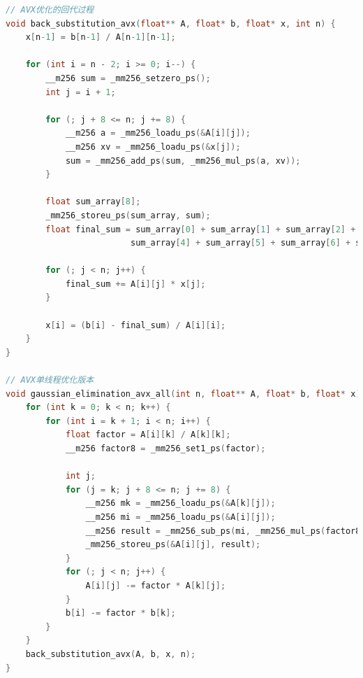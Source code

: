 \documentclass{nku}
\begin{document}
\begin{lstlisting}[language=C]
// AVX优化的回代过程
void back_substitution_avx(float** A, float* b, float* x, int n) {
    x[n-1] = b[n-1] / A[n-1][n-1];

    for (int i = n - 2; i >= 0; i--) {
        __m256 sum = _mm256_setzero_ps();
        int j = i + 1;

        for (; j + 8 <= n; j += 8) {
            __m256 a = _mm256_loadu_ps(&A[i][j]);
            __m256 xv = _mm256_loadu_ps(&x[j]);
            sum = _mm256_add_ps(sum, _mm256_mul_ps(a, xv));
        }

        float sum_array[8];
        _mm256_storeu_ps(sum_array, sum);
        float final_sum = sum_array[0] + sum_array[1] + sum_array[2] + sum_array[3] +
                         sum_array[4] + sum_array[5] + sum_array[6] + sum_array[7];

        for (; j < n; j++) {
            final_sum += A[i][j] * x[j];
        }

        x[i] = (b[i] - final_sum) / A[i][i];
    }
}

// AVX单线程优化版本
void gaussian_elimination_avx_all(int n, float** A, float* b, float* x) {
    for (int k = 0; k < n; k++) {
        for (int i = k + 1; i < n; i++) {
            float factor = A[i][k] / A[k][k];
            __m256 factor8 = _mm256_set1_ps(factor);

            int j;
            for (j = k; j + 8 <= n; j += 8) {
                __m256 mk = _mm256_loadu_ps(&A[k][j]);
                __m256 mi = _mm256_loadu_ps(&A[i][j]);
                __m256 result = _mm256_sub_ps(mi, _mm256_mul_ps(factor8, mk));
                _mm256_storeu_ps(&A[i][j], result);
            }
            for (; j < n; j++) {
                A[i][j] -= factor * A[k][j];
            }
            b[i] -= factor * b[k];
        }
    }
    back_substitution_avx(A, b, x, n);
}
\end{lstlisting}
\end{document}
